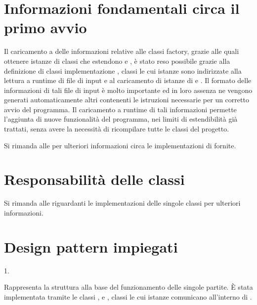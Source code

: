 \documentclass[letterpaper,10pt,italian,openany,oneside]{sphinxmanual}
\begin{document}
\section{Informazioni fondamentali circa il primo avvio}
\label{\detokenize{introduzione:informazioni-fondamentali-circa-il-primo-avvio}}
Il caricamento a  delle informazioni relative alle classi factory, grazie alle quali ottenere istanze di classi che estendono
 e , è stato reso possibile grazie alla definizione di classi implementazione , classi le cui istanze sono indirizzate
alla lettura a runtime di file di input e al caricamento di istanze di  e .
Il formato delle informazioni di tali file di input è molto importante ed in loro assenza ne vengono generati automaticamente altri
 contenenti le istruzioni necessarie per un corretto avvio del programma.
Il caricamento a runtime di tali informazioni permette l’aggiunta di nuove funzionalità del programma, nei limiti di estendibilità già trattati, senza avere la
necessità di ricompilare tutte le classi del progetto.

Si rimanda alle {\hyperref[\detokenize{source/packages::doc}]{}} per ulteriori informazioni circa le implementazioni di  fornite.


\section{Responsabilità delle classi}
\label{\detokenize{introduzione:responsabilita-delle-classi}}
Si rimanda alle {\hyperref[\detokenize{source/packages::doc}]{}} riguardanti le implementazioni delle singole classi per ulteriori informazioni.


\section{Design pattern impiegati}
\label{\detokenize{introduzione:design-pattern-impiegati}}
1.  %
\begin{footnote}[2]\sphinxAtStartFootnote
{}
%
\end{footnote}
Rappresenta la struttura alla base del funzionamento delle singole partite.
È stata implementata tramite le classi ,  e , classi le cui istanze comunicano all’interno di .
\end{document}

